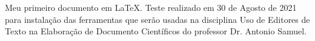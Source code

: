 \documentclass{article}
\begin{document}
Meu primeiro documento em \LaTeX. Teste realizado em 30 de Agosto de 2021 para instalação das ferramentas que serão usadas na disciplina Uso de Editores de Texto na Elaboração de Documento Científicos do professor Dr. Antonio Samuel.
\end{document}
